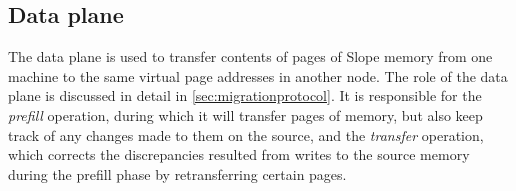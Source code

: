 

\subsection{Data plane}
The data plane is used to transfer contents of pages of Slope
memory from one machine to the same virtual page addresses in another node.
The role of the data plane is discussed in detail in \ref{sec:migrationprotocol}.
It is responsible for the \emph{prefill} operation, during which it will
transfer pages of memory, but also keep track of any changes made to them on
the source, and the \emph{transfer} operation, which corrects the discrepancies
resulted from writes to the source memory during the prefill phase by
retransferring certain pages.



